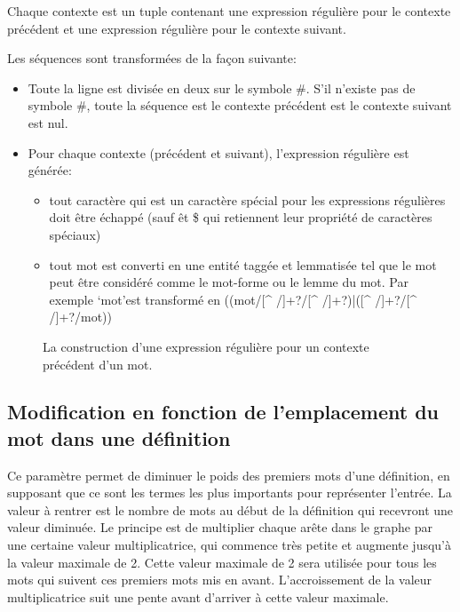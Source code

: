 Chaque contexte est un tuple contenant une expression régulière pour le contexte 
précédent et une expression régulière pour le contexte suivant.

Les séquences sont transformées de la façon suivante:
\begin{itemize}
    \item{Toute la ligne est divisée en deux sur le symbole \#. S'il n'existe 
    pas de symbole \#, toute la séquence est le contexte précédent est le 
    contexte suivant est nul.}
    \item{Pour chaque contexte (précédent et suivant), l'expression régulière 
    est générée:}
    \begin{itemize}
        \item{tout caractère qui est un caractère spécial pour les expressions 
        régulières doit être échappé (sauf \^ et \$ qui retiennent leur 
	propriété de caractères spéciaux)}
        \item{tout mot est converti en une entité taggée et lemmatisée tel que 
        le mot peut être considéré comme le mot-forme ou le lemme du mot. Par 
	exemple \lq{mot}\rq  est transformé en ((mot/[\string^ /]+?/[\string^ 
	/]+?)|([\string^ /]+?/[\string^ /]+?/mot)) }
    \end{itemize}
\end{itemize}

\begin{figure}
\centering
\parbox{17cm}{
\def\svgscale{0.6}

\caption{La construction d'une expression régulière pour un contexte précédent d'un mot.}
\label{fig:regex}}
\end{figure}

\subsection{Modification en fonction de l'emplacement du mot dans une définition}
Ce paramètre permet de diminuer le poids des premiers mots d'une définition, en supposant que ce sont les termes les plus importants pour représenter l'entrée. La valeur à rentrer est le nombre de mots au début de la définition qui recevront une valeur diminuée. Le principe est de multiplier chaque arête dans le graphe par une certaine valeur multiplicatrice, qui commence très petite et augmente jusqu'à la valeur maximale de 2. Cette valeur maximale de 2 sera utilisée pour tous les mots qui suivent ces premiers mots mis en avant. L'accroissement de la valeur multiplicatrice suit une pente avant d'arriver à cette valeur maximale.

